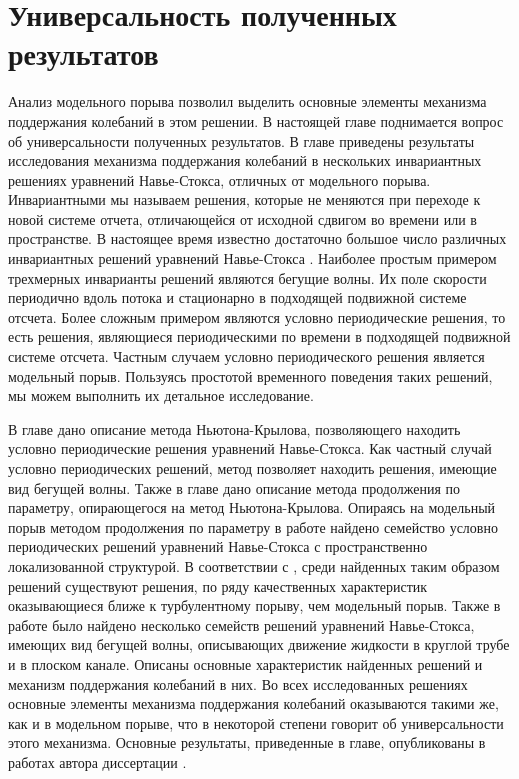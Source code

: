 \chapter{Универсальность полученных результатов}

Анализ модельного порыва позволил выделить основные элементы механизма поддержания колебаний в этом решении. В настоящей главе поднимается вопрос об универсальности полученных результатов. В главе приведены результаты исследования механизма поддержания колебаний в нескольких инвариантных решениях уравнений Навье-Стокса, отличных от модельного порыва. Инвариантными мы называем решения, которые не меняются при переходе к новой системе отчета, отличающейся от исходной сдвигом во времени или в пространстве. В настоящее время известно достаточно большое число различных инвариантных решений уравнений Навье-Стокса \cite{Kawahara2012}. Наиболее простым примером трехмерных инварианты решений являются бегущие волны. Их поле скорости периодично вдоль потока и стационарно в подходящей подвижной системе отсчета. Более сложным примером являются условно периодические решения, то есть решения, являющиеся периодическими по времени в подходящей подвижной системе отсчета. Частным случаем условно периодического решения является модельный порыв. Пользуясь простотой временного поведения таких решений, мы можем выполнить их детальное исследование. 

В главе дано описание метода Ньютона-Крылова, позволяющего находить условно периодические решения уравнений Навье-Стокса. Как частный случай условно периодических решений, метод позволяет находить решения, имеющие вид бегущей волны. Также в главе дано описание метода продолжения по параметру, опирающегося на метод Ньютона-Крылова. Опираясь на модельный порыв методом продолжения по параметру в работе найдено семейство условно периодических решений уравнений Навье-Стокса с пространственно локализованной структурой. В соответствии с \cite{Avila2013}, среди найденных таким образом решений существуют решения, по ряду качественных характеристик оказывающиеся ближе к турбулентному порыву, чем модельный порыв.  Также в работе было найдено несколько семейств решений уравнений Навье-Стокса, имеющих вид бегущей волны, описывающих движение жидкости в круглой трубе и в плоском канале. Описаны основные характеристик найденных решений и механизм поддержания колебаний в них. Во всех исследованных решениях основные элементы механизма поддержания колебаний оказываются такими же, как и в модельном порыве, что в некоторой степени говорит об универсальности этого механизма. Основные результаты, приведенные в главе, опубликованы в работах автора диссертации \cite{Vest18, KMU2016, Lomonosov2018, Lomonosov2017, LomRead2017, LomRead2016, Ob2018}. 


